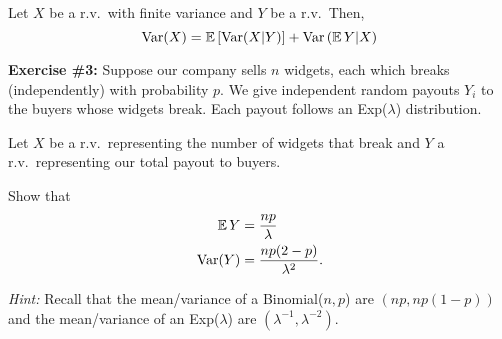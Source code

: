 \begin{theorem}
    Let $X$ be a r.v.\ with finite variance and $Y$ be a r.v.\
    Then,
    \[
        \text{Var}(X)
        =
        \operatorname*{\mathbb{E}} \left[ \text{Var}(X | Y) \right] + \text{Var} \left( \operatorname*{\mathbb{E}} Y | X \right)
    \]
\end{theorem}

\begin{tcolorbox}
    \textbf{Exercise \#3:}
    Suppose our company sells $n$ widgets, each which breaks (independently)
    with probability $p$. We give independent 
    random payouts $Y_i$ to the buyers whose widgets break. Each payout
    follows an Exp($\lambda$) distribution.

    Let $X$ be a r.v.\ representing the number of widgets that break and 
    $Y$ a r.v.\ representing our total payout to buyers. 

    Show that 
    \begin{align*}
        \operatorname*{\mathbb{E}} Y &= \frac{n p}{\lambda} \\
        \text{Var} (Y) &= \frac{np(2-p)}{\lambda^2}.
    \end{align*}

    \textit{Hint: } Recall that the mean/variance of a Binomial($n,p$) are $(np, np(1-p))$
                  and the mean/variance of an Exp($\lambda$) are $(\lambda^{-1}, \lambda^{-2})$.
\end{tcolorbox}

